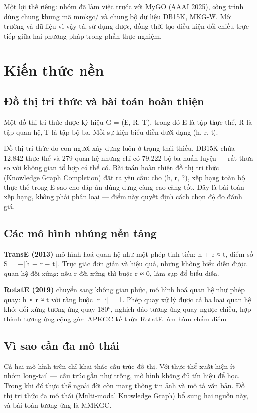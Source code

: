 \documentclass[11pt,a4paper]{article}
\newcommand{\code}[1]{{\ttfamily\small\color{codetext}#1}}
\begin{document}
Một lợi thế riêng: nhóm đã làm việc trước với MyGO (AAAI 2025), công trình dùng chung khung mã \code{mmkgc/} và chung bộ dữ liệu DB15K, MKG-W. Môi trường và dữ liệu vì vậy tái sử dụng được, đồng thời tạo điều kiện đối chiếu trực tiếp giữa hai phương pháp trong phần thực nghiệm.

\section{Kiến thức nền}
\subsection{Đồ thị tri thức và bài toán hoàn thiện}
Một đồ thị tri thức được ký hiệu \code{G = (E, R, T)}, trong đó \code{E} là tập thực thể, \code{R} là tập quan hệ, \code{T} là tập bộ ba. Mỗi sự kiện biểu diễn dưới dạng \code{(h, r, t)}.

Đồ thị tri thức do con người xây dựng luôn ở trạng thái thiếu. DB15K chứa 12.842 thực thể và 279 quan hệ nhưng chỉ có 79.222 bộ ba huấn luyện --- rất thưa so với không gian tổ hợp có thể có. Bài toán hoàn thiện đồ thị tri thức (Knowledge Graph Completion) đặt ra yêu cầu: cho \code{(h, r, ?)}, xếp hạng toàn bộ thực thể trong \code{E} sao cho đáp án đúng đứng càng cao càng tốt. Đây là bài toán xếp hạng, không phải phân loại --- điểm này quyết định cách chọn độ đo đánh giá.

\subsection{Các mô hình nhúng nền tảng}
\textbf{TransE (2013)} mô hình hoá quan hệ như một phép tịnh tiến: \code{h + r ≈ t}, điểm số \code{S = −‖h + r − t‖}. Trực giác đơn giản và hiệu quả, nhưng không biểu diễn được quan hệ đối xứng: nếu \code{r} đối xứng thì buộc \code{r ≈ 0}, làm sụp đổ biểu diễn.

\textbf{RotatE (2019)} chuyển sang không gian phức, mô hình hoá quan hệ như phép quay: \code{h ∘ r ≈ t} với ràng buộc \code{|r\_i| = 1}. Phép quay xử lý được cả ba loại quan hệ khó: đối xứng tương ứng quay 180°, nghịch đảo tương ứng quay ngược chiều, hợp thành tương ứng cộng góc. APKGC kế thừa RotatE làm hàm chấm điểm.

\subsection{Vì sao cần đa mô thái}
Cả hai mô hình trên chỉ khai thác cấu trúc đồ thị. Với thực thể xuất hiện ít --- nhóm long-tail --- cấu trúc gần như trống, mô hình không đủ tín hiệu để học. Trong khi đó thực thể ngoài đời còn mang thông tin ảnh và mô tả văn bản. Đồ thị tri thức đa mô thái (Multi-modal Knowledge Graph) bổ sung hai nguồn này, và bài toán tương ứng là MMKGC.
\end{document}

